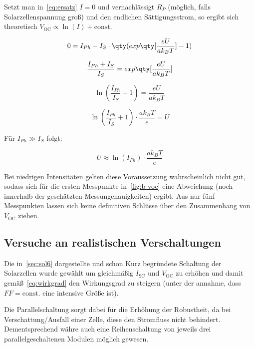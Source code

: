 \documentclass[slug=SZ, room=Hermann-Krone-Bau\,\ Labor\ 1.25, supervisor=Martin\ Kroll]{../../Lab_Report_LaTeX/lab_report}
\newcommand{\voc}{V_{\text{OC}}}
\newcommand{\isc}{I_{\text{SC}}}
\begin{document}
Setzt man in~\ref{eq:ersatz} \(I=0\) und vernachl\"assigt \(R_P\)
(m\"oglich, falls Solarzellenspannung gro\ss{}) und den endlichen
S\"attigungsstrom, so ergibt sich theoretisch
\(\voc\propto\ln(I) + \text{const}\).

\begin{equation}
        0 = I_{Ph} - I_S \cdot \qty(exp\qty[\frac{eU}{ak_BT}]-1)
\end{equation}

\begin{equation}
        \frac{I_{Ph}+I_S}{I_S} =  exp\qty[\frac{eU}{ak_BT}]
\end{equation}

\begin{equation}
        \ln(\frac{I_{Ph}}{I_S}+1) = \frac{eU}{ak_BT}
\end{equation}

\begin{equation}
        \ln(\frac{I_{Ph}}{I_S}+1) \cdot \frac{ak_BT}{e} = U
\end{equation}

Für \(I_{Ph} \gg I_S\) folgt:

\begin{equation}\label{eq:iphgross}
          U \approx \ln(I_{Ph}) \cdot \frac{ak_BT}{e}
\end{equation}

Bei niedrigen
Intensit\"aten gelten diese Voraussetzung wahrscheinlich nicht gut,
sodass sich f\"ur die ersten Messpunkte in~\ref{fig:b-voc} eine
Abweichung (noch innerhalb der gesch\"atzten Messungenauigkeiten)
ergibt. Aus nur f\"unf Messpunkten lassen sich keine definitiven
Schl\"usse \"uber den Zusammenhang von \(\voc\) ziehen.

\subsection{Versuche an realistischen Verschaltungen}
\label{sec:auswc}
Die in~\ref{sec:sol6} dargestellte und schon Kurz begr\"undete
Schaltung der Solarzellen wurde gew\"ahlt um gleichm\"a\ss{}ig
\(\isc\) und \(\voc\) zu erh\"ohen und damit
gem\"a\ss{}~\ref{eq:wirkgrad} den Wirkungsgrad zu steigern (unter der
annahme, dass \(FF=\text{const.}\) eine intensive Gr\"o\ss{}e ist).

Die Parallelschaltung sorgt dabei f\"ur die Erh\"ohung der Robustheit,
da bei Verschattung/Ausfall einer Zelle, diese den Stromfluss nicht
behindert. Dementsprechend w\"ahre auch eine Reihenschaltung von
jeweils drei parallelgeschaltenen Modulen m\"oglich gewesen.
\end{document}
